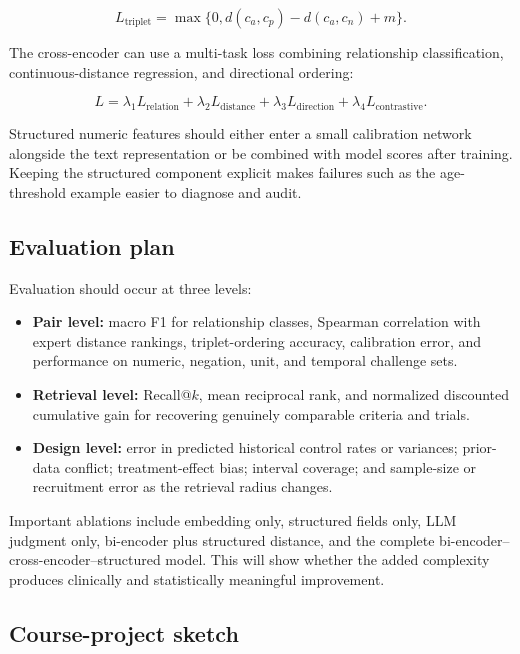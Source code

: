 \documentclass[11pt]{article}
\begin{document}
\[
L_{\mathrm{triplet}}
=
\max\{0,
d(c_a,c_p)-d(c_a,c_n)+m\}.
\]

The cross-encoder can use a multi-task loss combining relationship classification, continuous-distance regression, and directional ordering:

\[
L
=
\lambda_1 L_{\mathrm{relation}}
+\lambda_2 L_{\mathrm{distance}}
+\lambda_3 L_{\mathrm{direction}}
+\lambda_4 L_{\mathrm{contrastive}}.
\]

Structured numeric features should either enter a small calibration network alongside the text representation or be combined with model scores after training. Keeping the structured component explicit makes failures such as the age-threshold example easier to diagnose and audit.

\subsection*{Evaluation plan}

Evaluation should occur at three levels:

\begin{itemize}
    \item \textbf{Pair level:} macro F1 for relationship classes, Spearman correlation with expert distance rankings, triplet-ordering accuracy, calibration error, and performance on numeric, negation, unit, and temporal challenge sets.
    \item \textbf{Retrieval level:} Recall@$k$, mean reciprocal rank, and normalized discounted cumulative gain for recovering genuinely comparable criteria and trials.
    \item \textbf{Design level:} error in predicted historical control rates or variances; prior-data conflict; treatment-effect bias; interval coverage; and sample-size or recruitment error as the retrieval radius changes.
\end{itemize}

Important ablations include embedding only, structured fields only, LLM judgment only, bi-encoder plus structured distance, and the complete bi-encoder--cross-encoder--structured model. This will show whether the added complexity produces clinically and statistically meaningful improvement.

\subsection*{Course-project sketch}
\end{document}
